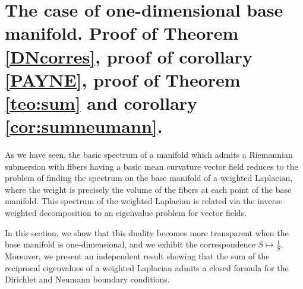 \documentclass{amsart}
\theoremstyle{definition}
\theoremstyle{remark}
\numberwithin{equation}{section}
\begin{document}
\section{The case of one-dimensional base manifold. Proof of Theorem \ref{DNcorres}, proof of corollary \ref{PAYNE}, proof of Theorem \ref{teo:sum} and corollary \ref{cor:sumneumann}.}\label{sec:sum} 

As we have seen, the basic spectrum of a manifold which admits a Riemannian submersion with fibers having a basic mean curvature vector field reduces to the problem of finding the spectrum on the base manifold of a weighted Laplacian, where the weight is precisely the volume of the fibers at each point of the base manifold. This spectrum of the weighted Laplacian is related via the inverse weighted decomposition to an eigenvalue problem for vector fields. 

In this section, we show that this duality becomes more transparent when the base manifold is one-dimensional, and we exhibit the correspondence $S\mapsto \frac{1}{S}$. Moreover, we present an independent result showing that the sum of the reciprocal eigenvalues of a weighted Laplacian admits a closed formula for the Dirichlet and Neumann boundary conditions.
\end{document}
